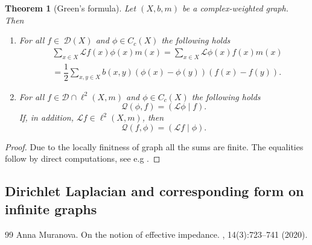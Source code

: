 \documentclass[10pt,a4paper]{amsart}
\newtheorem{theorem}{Theorem}[section]
\renewcommand{\L}{\mathcal{L}}
\newcommand{\D}{\mathcal{D}}
\begin{document}
\begin{theorem}[Green's formula]
Let $(X,b,m)$ be a complex-weighted graph. Then 
\begin{enumerate}[leftmargin=*]
\item[{\em (a)}]
For all $f\in~\D(X)$ and $\phi \in C_c(X)$ the following holds
\begin{align*}
&\sum_{x\in X}\L f(x) \phi(x) m(x)=\sum_{x\in X}\L \phi(x) f(x)m(x)\\
&=\dfrac{1}{2}\sum_{x,y\in X}b(x,y)(\phi(x)-\phi(y))(f(x)-f(y)).
\end{align*}

\item[{\em (b)}]
For all $f\in \D\cap \ell^2(X,m)$ and $\phi \in C_c(X)$ the following holds
\begin{equation*}
\mathcal Q(\phi, f)=(\L \phi\mid f).
\end{equation*}
If, in addition, $\L f\in  \ell^2(X,m)$, then
\begin{equation*}
\mathcal Q(f,\phi)=( \L f\mid \phi).
\end{equation*}
\end{enumerate}
\end{theorem}

\begin{proof}
Due to the locally finitness of graph all the sums are finite. The equalities follow by direct computations, see e.g \cite[Lemma 7]{Muranova1}. 
\end{proof}




\subsection{Dirichlet Laplacian and corresponding form on infinite graphs}\label{section::DirichletLaplacian}


\begin{thebibliography}{99}
 Anna Muranova. \newblock On the notion of effective impedance. , 14(3):723--741 (2020). %
\end{thebibliography}
\end{document}
